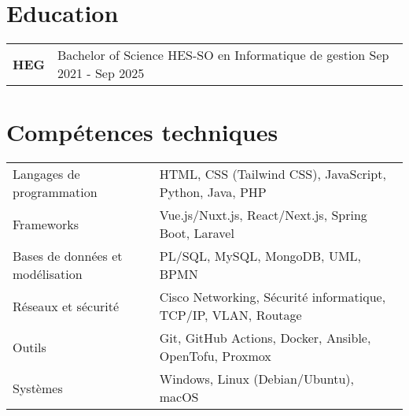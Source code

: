 \documentclass[a4paper,11pt]{article}
\begin{document}
\section{Education}
\begin{tabularx}{\linewidth}{@{}l X@{}}	
\textbf{HEG} & Bachelor of Science HES-SO en Informatique de gestion \hfill \normalsize Sep 2021 - Sep 2025\\

\end{tabularx}


\section{Compétences techniques}
\begin{tabularx}{\linewidth}{@{}l X@{}}
Langages de programmation & HTML, CSS (Tailwind CSS), JavaScript, Python, Java, PHP \\
Frameworks & Vue.js/Nuxt.js, React/Next.js, Spring Boot, Laravel \\
Bases de données et modélisation & PL/SQL, MySQL, MongoDB, UML, BPMN \\
Réseaux et sécurité & Cisco Networking, Sécurité informatique, TCP/IP, VLAN, Routage \\
Outils & Git, GitHub Actions, Docker, Ansible, OpenTofu, Proxmox \\
Systèmes & Windows, Linux (Debian/Ubuntu), macOS \\
\end{tabularx}
\end{document}
